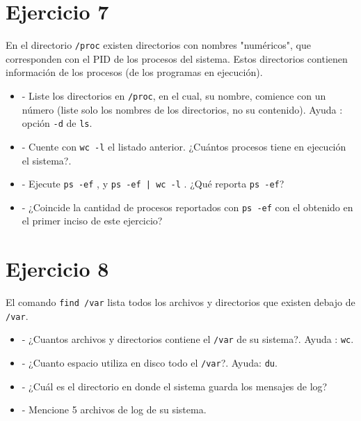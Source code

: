 \documentclass[12pt]{article}
\begin{document}
\section*{Ejercicio 7}
En el directorio \texttt{/proc} existen directorios con nombres "numéricos", que corresponden con el PID de los procesos del sistema.
Estos directorios contienen información de los procesos (de los programas en ejecución).
\begin{itemize}
\item - Liste los directorios en \texttt{/proc}, en el cual, su nombre, comience con un número (liste solo los nombres de los directorios, no su contenido). Ayuda : opción \texttt{-d} de \texttt{ls}.
\item - Cuente con \texttt{wc -l} el listado anterior. ¿Cuántos procesos tiene en ejecución el sistema?.
\item - Ejecute \texttt{ps -ef} , y \texttt{ps -ef | wc -l} . ¿Qué reporta \texttt{ps -ef}?
\item - ¿Coincide la cantidad de procesos reportados con \texttt{ps -ef} con el obtenido en el primer inciso de este ejercicio?
\end{itemize}


\section*{Ejercicio 8}
El comando \texttt{find /var} lista todos los archivos y directorios que existen debajo de \texttt{/var}.
\begin{itemize}
\item - ¿Cuantos archivos y directorios contiene el \texttt{/var} de su sistema?. Ayuda : \texttt{wc}.
\item - ¿Cuanto espacio utiliza en disco todo el \texttt{/var}?. Ayuda: \texttt{du}.
\item - ¿Cuál es el directorio en donde el sistema guarda los mensajes de log?
\item - Mencione 5 archivos de log de su sistema.
\end{itemize}
\end{document}
